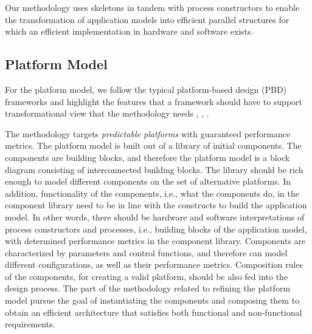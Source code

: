 Our methodology uses skeletons in tandem with process constructors to enable the transformation of application models into efficient parallel structures for which an efficient implementation in hardware and software exists.

\subsection{Platform Model}
\label{sec:platform model}

For the platform model, we follow the typical platform-based design (PBD) frameworks and highlight the features that a framework should have to support transformational view that the methodology needs \cite{attarzadeh2014framework}, \cite{nuzzo2015platform}, \cite{hendriks2020interface}. 

The  methodology  targets \textit{predictable platforms}  with  guaranteed  performance  metrics. The platform model is  built out of a library of initial components. The components are building blocks, and therefore the platform model is a block diagram consisting of interconnected
building blocks. The library should be rich enough to model different components on the set of alternative platforms. In addition, functionality of the components, i.e., what the components do, in the component library need to be in line with the constructs to build the application model. In other words, there should be hardware and software interpretations of process constructors and processes, i.e., building blocks of the application model, with determined performance metrics in the component library. Components are characterized by parameters and control functions, and therefore can model different configurations, as well as their performance metrics. Composition rules of the components, for creating a valid platform, should be also fed into the design process. 
The part of the methodology related to refining the platform model pursue the goal of instantiating the components and composing them to obtain an efficient architecture that satisfies both functional and non-functional requirements.




